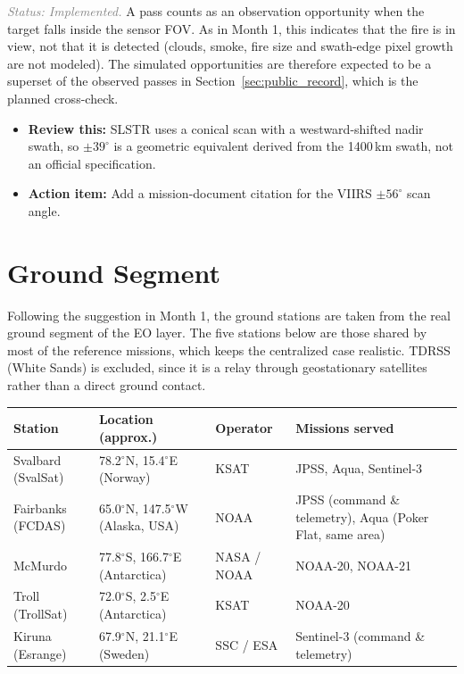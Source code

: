 \documentclass[11pt]{article}
\newcommand{\actionitem}[1]{\textcolor{todo}{\textbf{Action item:}} #1}
\newcommand{\status}[1]{\textit{\textcolor{gray}{Status: #1}}}
\newcommand{\review}[1]{\textcolor{review}{\textbf{Review this:}} #1}
\begin{document}
\status{Implemented.} A pass counts as an observation opportunity when the target falls inside the sensor FOV. As in Month 1, this indicates that the fire is in view, not that it is detected (clouds, smoke, fire size and swath-edge pixel growth are not modeled). The simulated opportunities are therefore expected to be a superset of the observed passes in Section~\ref{sec:public_record}, which is the planned cross-check.
\begin{itemize}[leftmargin=1.2cm]
    \item \review{SLSTR uses a conical scan with a westward-shifted nadir swath, so $\pm 39^\circ$ is a geometric equivalent derived from the 1400\,km swath, not an official specification.}
    \item \actionitem{Add a mission-document citation for the VIIRS $\pm 56^\circ$ scan angle.}
\end{itemize}

\section{Ground Segment}\label{sec:gs}

Following the suggestion in Month 1, the ground stations are taken from the real ground segment of the EO layer. The five stations below are those shared by most of the reference missions, which keeps the centralized case realistic. TDRSS (White Sands) is excluded, since it is a relay through geostationary satellites rather than a direct ground contact.

\begin{longtable}{p{3.2cm}p{3.6cm}p{2.3cm}p{4.6cm}}
\toprule
\textbf{Station} & \textbf{Location (approx.)} & \textbf{Operator} & \textbf{Missions served} \\
\midrule
\endhead
Svalbard (SvalSat) & 78.2$^\circ$N, 15.4$^\circ$E (Norway) & KSAT & JPSS, Aqua, Sentinel-3 \\
Fairbanks (FCDAS) & 65.0$^\circ$N, 147.5$^\circ$W (Alaska, USA) & NOAA & JPSS (command \& telemetry), Aqua (Poker Flat, same area) \\
McMurdo & 77.8$^\circ$S, 166.7$^\circ$E (Antarctica) & NASA / NOAA & NOAA-20, NOAA-21 \\
Troll (TrollSat) & 72.0$^\circ$S, 2.5$^\circ$E (Antarctica) & KSAT & NOAA-20 \\
Kiruna (Esrange) & 67.9$^\circ$N, 21.1$^\circ$E (Sweden) & SSC / ESA & Sentinel-3 (command \& telemetry) \\
\bottomrule
\end{longtable}
\end{document}
